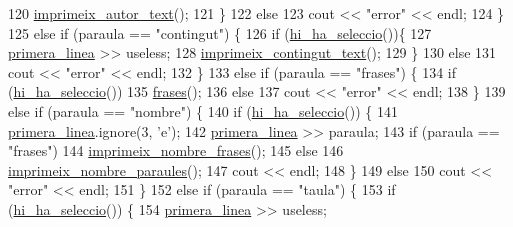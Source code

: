 \begin{DoxyCode}
120             \hyperlink{class_cjt__autors_a583a23dac0ab39f588aae1df306b7dc3}{imprimeix\_autor\_text}();
121         \}
122         \textcolor{keywordflow}{else}
123             cout << \textcolor{stringliteral}{"error"} << endl;
124     \}
125     \textcolor{keywordflow}{else} \textcolor{keywordflow}{if} (paraula == \textcolor{stringliteral}{"contingut"}) \{
126         \textcolor{keywordflow}{if} (\hyperlink{class_cjt__autors_a60adf6ed96d0c69487bd7e9de6aa7e1d}{hi\_ha\_seleccio}())\{
127             \hyperlink{class_cjt__autors_a833753dc5eaa466591f7dce971e5021c}{primera\_linea} >> useless;
128             \hyperlink{class_cjt__autors_a56fbd0fb78bf29adc6525c9d2a6ae117}{imprimeix\_contingut\_text}();
129         \}
130         \textcolor{keywordflow}{else}
131             cout << \textcolor{stringliteral}{"error"} << endl;
132     \}
133     \textcolor{keywordflow}{else} \textcolor{keywordflow}{if} (paraula == \textcolor{stringliteral}{"frases"}) \{
134         \textcolor{keywordflow}{if} (\hyperlink{class_cjt__autors_a60adf6ed96d0c69487bd7e9de6aa7e1d}{hi\_ha\_seleccio}())
135             \hyperlink{class_cjt__autors_a9449545eb6877cb96e54d121faff04d1}{frases}();
136         \textcolor{keywordflow}{else}
137             cout << \textcolor{stringliteral}{"error"} << endl;
138     \}
139     \textcolor{keywordflow}{else} \textcolor{keywordflow}{if} (paraula == \textcolor{stringliteral}{"nombre"}) \{
140         \textcolor{keywordflow}{if} (\hyperlink{class_cjt__autors_a60adf6ed96d0c69487bd7e9de6aa7e1d}{hi\_ha\_seleccio}()) \{
141             \hyperlink{class_cjt__autors_a833753dc5eaa466591f7dce971e5021c}{primera\_linea}.ignore(3, \textcolor{charliteral}{'e'});
142             \hyperlink{class_cjt__autors_a833753dc5eaa466591f7dce971e5021c}{primera\_linea} >> paraula;
143             \textcolor{keywordflow}{if} (paraula == \textcolor{stringliteral}{"frases"})
144                 \hyperlink{class_cjt__autors_ad6a8a06f8a706808a133d0c11c579656}{imprimeix\_nombre\_frases}();
145             \textcolor{keywordflow}{else}
146                 \hyperlink{class_cjt__autors_a63c6fd83a2ce3a2bd150237fe9619f8c}{imprimeix\_nombre\_paraules}();
147             cout << endl;
148         \}
149         \textcolor{keywordflow}{else}
150             cout << \textcolor{stringliteral}{"error"} << endl;
151     \}
152     \textcolor{keywordflow}{else} \textcolor{keywordflow}{if} (paraula == \textcolor{stringliteral}{"taula"}) \{
153         \textcolor{keywordflow}{if} (\hyperlink{class_cjt__autors_a60adf6ed96d0c69487bd7e9de6aa7e1d}{hi\_ha\_seleccio}()) \{
154             \hyperlink{class_cjt__autors_a833753dc5eaa466591f7dce971e5021c}{primera\_linea} >> useless;

\end{DoxyCode}
